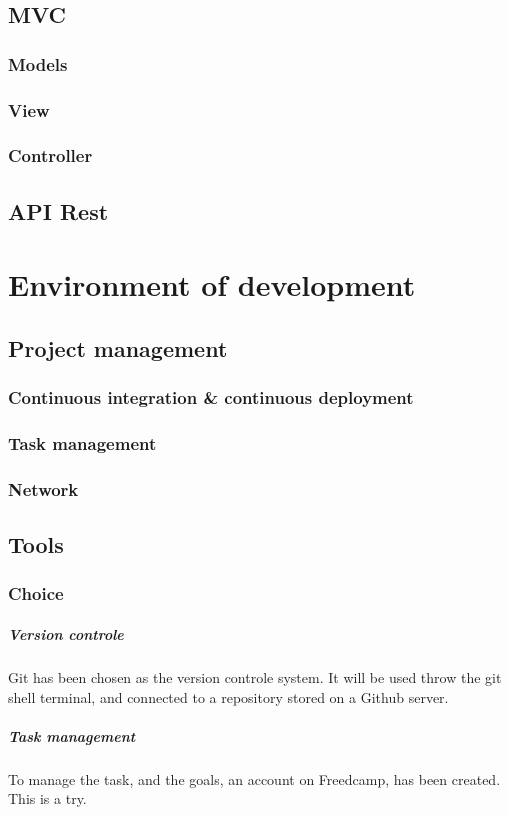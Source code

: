 \documentclass[a4paper, 12pt, openany]{book}
\begin{document}
\section{MVC}
\subsection{Models}
\subsection{View}
\subsection{Controller}
\section{API Rest}
\chapter{Environment of development}
\section{Project management}
\subsection{Continuous integration \& continuous deployment}
\subsection{Task management}
\subsection{Network}
\section{Tools}
\subsection{Choice}
\paragraph{Version controle}
Git has been chosen as the version controle system.
It will be used throw the git shell terminal, and connected to a repository stored on a Github server.
\paragraph{Task management}
To manage the task, and the goals, an account on Freedcamp, has been created.
This is a try.
\end{document}
